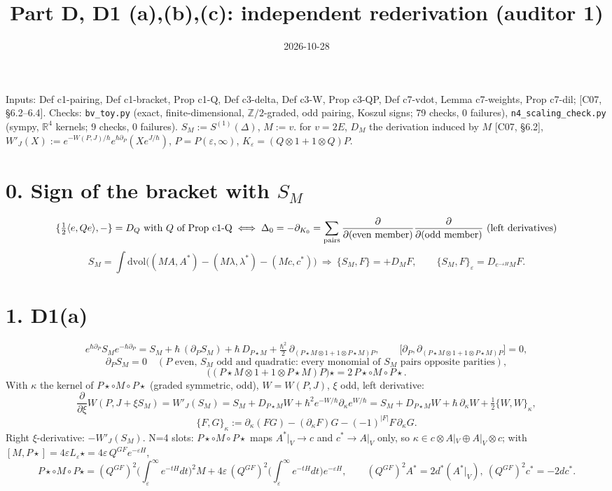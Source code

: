 \documentclass[11pt]{article}
\title{Part D, D1 (a),(b),(c): independent rederivation (auditor 1)}
\date{2026-10-28}
\begin{document}
\maketitle

\noindent Inputs: Def c1-pairing, Def c1-bracket, Prop c1-Q, Def c3-delta, Def c3-W, Prop c3-QP, Def c7-vdot, Lemma c7-weights, Prop c7-dil; [C07, §6.2--6.4].
Checks: \texttt{bv\_toy.py} (exact, finite-dimensional, $\mathbb Z/2$-graded, odd pairing, Koszul signs; 79 checks, 0 failures),
\texttt{n4\_scaling\_check.py} (sympy, $\mathbb R^4$ kernels; 9 checks, 0 failures).
$S_M:=S^{(1)}(\Delta)$, $M:=v.$ for $v=2E$, $D_M$ the derivation induced by $M$ [C07, §6.2],
$W'_J(X):=e^{-W(P,J)/\hbar}e^{\hbar\partial_P}(Xe^{J/\hbar})$, $P=P(\varepsilon,\infty)$, $K_\varepsilon=(Q\otimes1+1\otimes Q)P$.

\section*{0. Sign of the bracket with $S_M$}
\[
\{\tfrac12\langle e,Qe\rangle,-\}=D_Q\ \text{with }Q\text{ of Prop c1-Q}
\;\Longleftrightarrow\;
\Delta_0=-\partial_{K_0}=\sum_{\rm pairs}\frac{\partial}{\partial(\text{even member})}\frac{\partial}{\partial(\text{odd member})}\ \text{(left derivatives)}
\]
\[
S_M=\int\mathrm{dvol}\Big((MA,A^*)-(M\lambda,\lambda^*)-(Mc,c^*)\Big)\ \Longrightarrow\ \{S_M,F\}=+D_MF ,\qquad \{S_M,F\}_\varepsilon=D_{e^{-\varepsilon H}M}F .
\]

\section*{1. D1(a)}
\[
e^{\hbar\partial_P}S_Me^{-\hbar\partial_P}=S_M+\hbar\,(\partial_PS_M)+\hbar\,D_{P\star M}+\tfrac{\hbar^2}2\,\partial_{(P\star M\otimes1+1\otimes P\star M)P},\qquad
\big[\partial_P,\partial_{(P\star M\otimes1+1\otimes P\star M)P}\big]=0,
\]
\[
\partial_PS_M=0\quad(\text{$P$ even, $S_M$ odd and quadratic: every monomial of $S_M$ pairs opposite parities}),
\]
\[
\big((P\star M\otimes1+1\otimes P\star M)P\big)\star=2\,P\star\circ M\circ P\star .
\]
With $\kappa$ the kernel of $P\star\circ M\circ P\star$ (graded symmetric, odd), $W=W(P,J)$, $\xi$ odd, left derivative:
\[
\frac{\partial}{\partial\xi}W(P,J+\xi S_M)=W'_J(S_M)
=S_M+D_{P\star M}W+\hbar^2e^{-W/\hbar}\partial_\kappa e^{W/\hbar}
=S_M+D_{P\star M}W+\hbar\,\partial_\kappa W+\tfrac12\{W,W\}_\kappa ,
\]
\[
\{F,G\}_\kappa:=\partial_\kappa(FG)-(\partial_\kappa F)G-(-1)^{|F|}F\,\partial_\kappa G .
\]
Right $\xi$-derivative: $-W'_J(S_M)$.
N=4 slots: $P\star\circ M\circ P\star$ maps $A^*|_V\to c$ and $c^*\to A|_V$ only, so $\kappa\in c\otimes A|_V\oplus A|_V\otimes c$; with $[M,P\star]=4\varepsilon L_\varepsilon\star=4\varepsilon\,Q^{GF}e^{-\varepsilon H}$,
\[
P\star\circ M\circ P\star=(Q^{GF})^2\Big(\textstyle\int_\varepsilon^\infty e^{-tH}dt\Big)^2M+4\varepsilon\,(Q^{GF})^2\Big(\textstyle\int_\varepsilon^\infty e^{-tH}dt\Big)e^{-\varepsilon H},
\qquad (Q^{GF})^2A^*=2d^*(A^*|_V),\ (Q^{GF})^2c^*=-2dc^*.
\]
\end{document}

